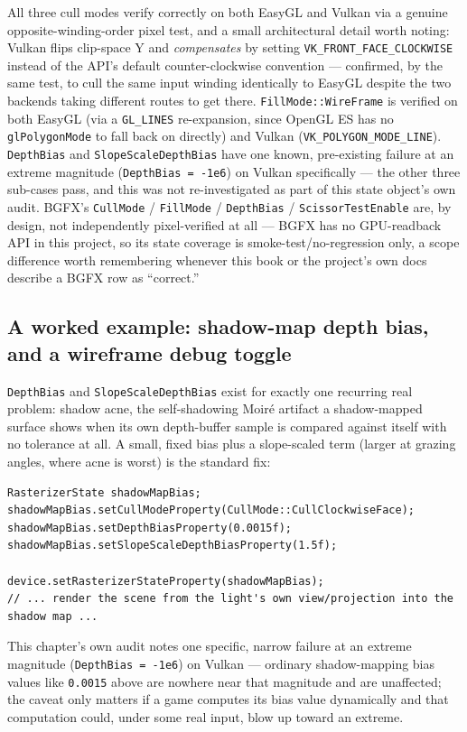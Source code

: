 All three cull modes verify correctly on both EasyGL and Vulkan via a genuine
opposite-winding-order pixel test, and a small architectural detail worth noting: Vulkan
flips clip-space Y and \emph{compensates} by setting \texttt{VK\_FRONT\_FACE\_CLOCKWISE}
instead of the API's default counter-clockwise convention --- confirmed, by the same test, to
cull the same input winding identically to EasyGL despite the two backends taking different
routes to get there. \texttt{FillMode::WireFrame} is verified on both EasyGL (via a
\texttt{GL\_LINES} re-expansion, since OpenGL ES has no \texttt{glPolygonMode} to fall back
on directly) and Vulkan (\texttt{VK\_POLYGON\_MODE\_LINE}). \texttt{DepthBias} and
\texttt{SlopeScaleDepthBias} have one known, pre-existing failure at an extreme magnitude
(\texttt{DepthBias = -1e6}) on Vulkan specifically --- the other three sub-cases pass, and
this was not re-investigated as part of this state object's own audit. BGFX's
\texttt{CullMode} / \texttt{FillMode} / \texttt{DepthBias} / \texttt{ScissorTestEnable} are, by
design, not independently pixel-verified at all --- BGFX has no GPU-readback API in this
project, so its state coverage is smoke-test/no-regression only, a scope difference worth
remembering whenever this book or the project's own docs describe a BGFX row as
``correct.''

\subsection{A worked example: shadow-map depth bias, and a wireframe debug toggle}

\texttt{DepthBias} and \texttt{SlopeScaleDepthBias} exist for exactly one recurring real
problem: shadow acne, the self-shadowing Moir\'e artifact a shadow-mapped surface shows when its
own depth-buffer sample is compared against itself with no tolerance at all. A small, fixed bias
plus a slope-scaled term (larger at grazing angles, where acne is worst) is the standard fix:

\begin{lstlisting}
RasterizerState shadowMapBias;
shadowMapBias.setCullModeProperty(CullMode::CullClockwiseFace);
shadowMapBias.setDepthBiasProperty(0.0015f);
shadowMapBias.setSlopeScaleDepthBiasProperty(1.5f);

device.setRasterizerStateProperty(shadowMapBias);
// ... render the scene from the light's own view/projection into the shadow map ...
\end{lstlisting}

This chapter's own audit notes one specific, narrow failure at an extreme magnitude
(\texttt{DepthBias = -1e6}) on Vulkan --- ordinary shadow-mapping bias values like \texttt{0.0015}
above are nowhere near that magnitude and are unaffected; the caveat only matters if a game
computes its bias value dynamically and that computation could, under some real input, blow up
toward an extreme.

